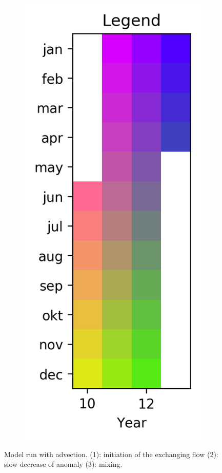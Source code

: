 \documentclass[twocolumn]{article}
\begin{document}
\begin{figure}
\begin{subfigure}[h]{0.20\textwidth}
\includegraphics[width=1.0\textwidth,keepaspectratio]{with_adv_large_effect_40SV_Legend.png}
\end{subfigure}\hfill
\caption{Model run with advection. (1): initiation of the exchanging flow (2): slow decrease of anomaly (3): mixing. }
\label{fig:with_adv_large_effect}
\end{figure}
\end{document}
